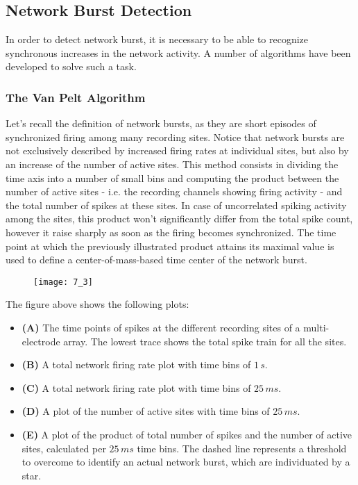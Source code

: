 \subsection{Network Burst Detection}
In order to detect network burst, it is necessary to be able to recognize synchronous
increases in the network activity. A number of algorithms have been developed to
solve such a task.
\subsubsection{The Van Pelt Algorithm}
Let's recall the definition of network bursts, as they are short episodes of
synchronized firing among many recording sites. Notice that network bursts are not
exclusively described by increased firing rates at individual sites, but also by an
increase of the number of active sites. This method consists in dividing the time
axis into a number of small bins and computing the product between the number of
active sites - i.e. the recording channels showing firing activity - and the total
number of spikes at these sites. In case of uncorrelated spiking activity among
the sites, this product won't significantly differ from the total spike count, however
it raise sharply as soon as the firing becomes synchronized. The time point at
which the previously illustrated product attains its maximal value is used to
define a center-of-mass-based time center of the network burst.
\begin{figure}[H]
    \texttt{[image: 7\_3]}
    \centering
\end{figure}
The figure above shows the following plots:
\begin{itemize}
    \item \textbf{(A)} The time points of spikes at the different recording sites of
          a multi-electrode array. The lowest trace shows the total spike train for all
          the sites.
    \item \textbf{(B)} A total network firing rate plot with time bins of \(1\,s\).
    \item \textbf{(C)} A total network firing rate plot with time bins of \(25\,ms\).
    \item \textbf{(D)} A plot of the number of active sites with time bins
          of \(25\,ms\).
    \item \textbf{(E)} A plot of the product of total number of spikes and the
          number of active sites, calculated per \(25\,ms\) time bins. The dashed line
          represents a threshold to overcome to identify an actual network burst, which
          are individuated by a star.
\end{itemize}
